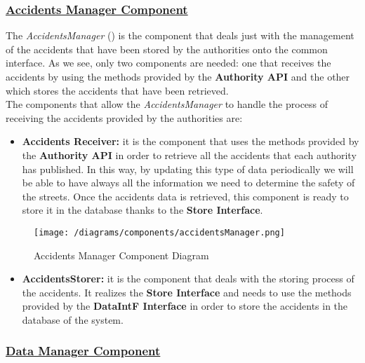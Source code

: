		\subsubsection[Accidents Manager Component]{\hyperlink{toc}{Accidents Manager Component}}
			\label{sec:accidentsManagerComponent}
			
			The \emph{AccidentsManager} () is the component that deals just with the management of the accidents that have been stored by the authorities onto the common interface. As we see, only two components are needed: one that receives the accidents by using the methods provided by the \textbf{Authority API} and the other which stores the accidents that have been retrieved.\\
			
			The components that allow the \emph{AccidentsManager} to handle the process of receiving the accidents provided by the authorities are:
			
			\begin{itemize}
				\item \textbf{Accidents Receiver:} it is the component that uses the methods provided by the \textbf{Authority API} in order to retrieve all the accidents that each authority has published. In this way, by updating this type of data periodically we will be able to have always all the information we need to determine the safety of the streets. Once the accidents data is retrieved, this component is ready to store it in the database thanks to the \textbf{Store Interface}.
			\end{itemize}
			
			\begin{figure}[ht]
				\centering
				\texttt{[image: /diagrams/components/accidentsManager.png]}
				\caption{\label{fig:accidentsManagerComp} Accidents Manager Component Diagram}
			\end{figure}
		
			\begin{itemize}
				\item \textbf{AccidentsStorer:} it is the component that deals with the storing process of the accidents. It realizes the \textbf{Store Interface} and needs to use the methods provided by the \textbf{DataIntF Interface} in order to store the accidents in the database of the system.
			\end{itemize}
		
		\subsubsection[Data Manager Component]{\hyperlink{toc}{Data Manager Component}}
			\label{sec:dataManagerComponent}
			
